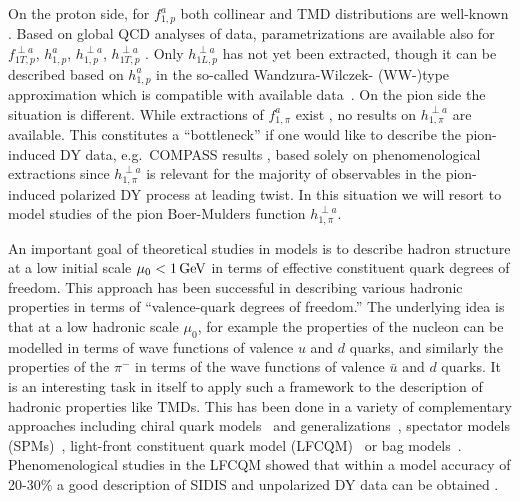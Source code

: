 \documentclass[a4paper]{article}
\begin{document}
On the proton side, for $f^a_{1,p}$ both collinear and TMD distributions
are well-known \cite{Gluck:1991ng,Gluck:1994uf,Gluck:1998xa,Martin:2009iq,
Harland-Lang:2014zoa,Dulat:2015mca,Landry:2002ix,Anselmino:2013lza,
Signori:2013mda,Bacchetta:2019sam,Scimemi:2019cmh}.  
Based on global QCD analyses of data, parametrizations are available also for
$f_{1T,p}^{\perp a}$, $h_{1,p}^a$, $h_{1,p}^{\perp a}$, $h_{1T,p}^{\perp a}$ \cite{Anselmino:2011gs,Anselmino:2013vqa,Barone:2009hw,Lefky:2014eia,Cammarota:2020qcw}. 
Only $h_{1L,p}^{\perp a}$ has not yet been extracted, 
though it can be described based on $h_{1,p}^a$ in the 
so-called Wandzura-Wilczek- (WW-)type approximation 
which is compatible with available data~\cite{Bastami:2018xqd}.
On the pion side the situation is different. While extractions of $f_{1,\pi}^a$ 
exist \cite{Gluck:1991ey,Sutton:1991ay,Gluck:1999xe,Aicher:2010cb,Barry:2018ort,Novikov:2020snp}, 
no results on $h_{1,\pi}^{\perp a}$ are available. This constitutes 
a ``bottleneck'' if one would like to describe the pion-induced DY data, 
e.g.\ COMPASS results \cite{Aghasyan:2017jop}, 
based solely on phenomenological extractions since 
$h_{1,\pi}^{\perp a}$ is relevant for the majority of observables 
in the pion-induced polarized DY process at leading twist.
In this situation we will resort to model studies of the pion Boer-Mulders function 
$h_{1,\pi}^{\perp a}$.

An important goal of theoretical studies in models is to describe 
hadron structure at a low initial scale $\mu_0< 1\,{\rm GeV}$ in terms 
of effective constituent quark degrees of freedom. This approach has been
successful in describing various hadronic properties in terms 
of ``valence-quark degrees of freedom.'' The underlying idea is that 
at a low hadronic scale $\mu_0$, for example the properties of the nucleon 
can be modelled in terms of wave functions of valence $u$ and $d$ quarks, 
and similarly the properties of the $\pi^-$ in terms of the wave 
functions of valence $\bar u$ and $d$ quarks. It is an interesting task 
in itself to apply such a framework to the description of hadronic properties
like TMDs. This has been done in a variety of complementary approaches 
including chiral quark models~\cite{Weigel:1999pc} and generalizations~\cite{RuizArriola:2003bs}, spectator models (SPMs)~\cite{Jakob:1997wg,Gamberg:2007wm,Gamberg:2009uk,
Bacchetta:2008af,Lu:2004hu}, light-front constituent quark model (LFCQM)~\cite{Pasquini:2008ax,Pasquini:2010af,Lorce:2011dv,
Boffi:2009sh,Pasquini:2011tk,Pasquini:2014ppa,Lorce:2014hxa,Lorce:2016ugb} 
or bag models~\cite{Yuan:2003wk,Avakian:2008dz,Courtoy:2008vi,Courtoy:2008dn,
Avakian:2010br}. Phenomenological studies in the LFCQM showed that within a model accuracy of 20-30$\%$ a good description of SIDIS and unpolarized DY data can be
obtained \cite{Boffi:2009sh,Pasquini:2011tk,Pasquini:2014ppa}.
\end{document}
